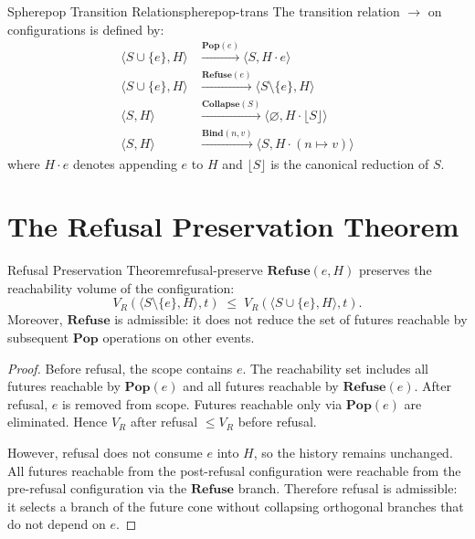 \documentclass[12pt,twoside,openright]{book}
\begin{document}
\begin{definition}{Spherepop Transition Relation}{spherepop-trans}
  The transition relation $\to$ on configurations is
  defined by:
  \begin{align*}
    \langle S \cup \{e\}, H \rangle
    &\xrightarrow{\mathbf{Pop}(e)}
    \langle S, H \cdot e \rangle \\
    \langle S \cup \{e\}, H \rangle
    &\xrightarrow{\mathbf{Refuse}(e)}
    \langle S \setminus \{e\}, H \rangle \\
    \langle S, H \rangle
    &\xrightarrow{\mathbf{Collapse}(S)}
    \langle \varnothing, H \cdot \lfloor S \rfloor \rangle \\
    \langle S, H \rangle
    &\xrightarrow{\mathbf{Bind}(n,v)}
    \langle S, H \cdot (n \mapsto v) \rangle
  \end{align*}
  where $H \cdot e$ denotes appending $e$ to $H$ and
  $\lfloor S \rfloor$ is the canonical reduction of $S$.
\end{definition}

\section{The Refusal Preservation Theorem}

\begin{theorem}{Refusal Preservation Theorem}{refusal-preserve}
  $\mathbf{Refuse}(e, H)$ preserves the reachability
  volume of the configuration:
  \[
    V_R(\langle S \setminus \{e\}, H \rangle, t)
    \;\le\;
    V_R(\langle S \cup \{e\}, H \rangle, t).
  \]
  Moreover, $\mathbf{Refuse}$ is admissible: it does not
  reduce the set of futures reachable by subsequent
  $\mathbf{Pop}$ operations on other events.
\end{theorem}

\begin{proof}
  Before refusal, the scope contains $e$.
  The reachability set includes all futures reachable
  by $\mathbf{Pop}(e)$ and all futures reachable by
  $\mathbf{Refuse}(e)$.
  After refusal, $e$ is removed from scope.
  Futures reachable only via $\mathbf{Pop}(e)$ are
  eliminated.
  Hence $V_R$ after refusal $\le V_R$ before refusal.

  However, refusal does not consume $e$ into $H$,
  so the history remains unchanged.
  All futures reachable from the post-refusal configuration
  were reachable from the pre-refusal configuration
  via the $\mathbf{Refuse}$ branch.
  Therefore refusal is admissible: it selects a branch
  of the future cone without collapsing orthogonal branches
  that do not depend on $e$.
\end{proof}
\end{document}
